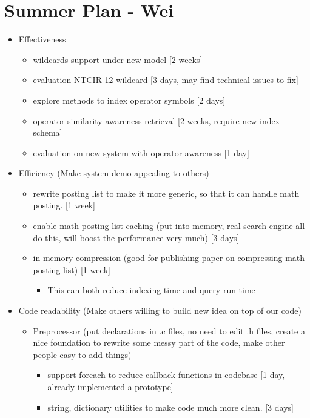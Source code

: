 \documentclass[12pt]{article} %
\begin{document}
\section*{Summer Plan - Wei} %

\begin{itemize}
	\item Effectiveness
		\begin{itemize}
		\item wildcards support under new model [2 weeks]
		\item evaluation NTCIR-12 wildcard [3 days, may find technical issues to fix]
		\item explore methods to index operator symbols [2 days]
		\item operator similarity awareness retrieval [2 weeks, require new index schema]
		\item evaluation on new system with operator awareness [1 day]
		\end{itemize}
	\item Efficiency (Make system demo appealing to others) 
		\begin{itemize}
		\item rewrite posting list to make it more generic, so that it can handle math posting. [1 week]
		\item enable math posting list caching (put into memory, real search engine all do this, will boost the performance very much) [3 days]
		\item in-memory compression (good for publishing paper on compressing math posting list) [1 week]
		\begin{itemize}
			\item This can both reduce indexing time and query run time
		\end{itemize}
		\end{itemize}
	\item Code readability (Make others willing to build new idea on top of our code)
		\begin{itemize}
			\item Preprocessor (put declarations in .c files, no need to edit .h files, create a nice foundation to rewrite some messy part of the code, make other people easy to add things)
			\begin{itemize}
				\item support foreach to reduce callback functions in codebase [1 day, already implemented a prototype]
				\item string, dictionary utilities to make code much more clean. [3 days]

\end{itemize}
\end{itemize}
\end{itemize}
\end{document}
